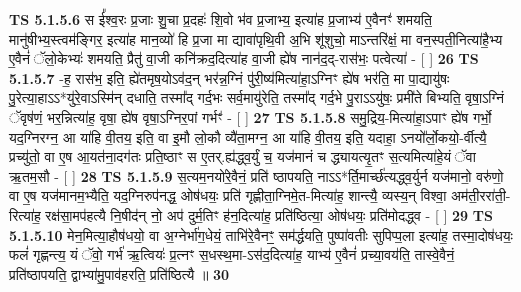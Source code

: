 \documentclass[17pt]{extarticle}
\begin{document}
                  \newline
                                \textbf{ TS 5.1.5.6} \newline
                  स ई᳚श्व॒रः प्र॒जाः शु॒चा प्र॒दहः॑ शि॒वो भ॑व प्र॒जाभ्य॒ इत्या॑ह प्र॒जाभ्य॑ ए॒वैनꣳ॑ शमयति॒ मानु॑षीभ्य॒स्त्वम॑ङ्गिर॒ इत्या॑ह मान॒व्यो॑ हि प्र॒जा मा द्यावा॑पृथि॒वी अ॒भि शू॑शुचो॒ माऽन्तरि॑क्षं॒ मा वन॒स्पती॒नित्या॑है॒भ्य ए॒वैनं॑ ॅलो॒केभ्यः॑ शमयति॒ प्रैतु॑ वा॒जी कनि॑क्रद॒दित्या॑ह वा॒जी ह्ये॑ष नान॑द॒द्-रास॑भः॒ पत्वेत्या॑ - [  ] \textbf{  26} \newline
                  \newline
                                \textbf{ TS 5.1.5.7} \newline
                  -ह॒ रास॑भ॒ इति॒ ह्ये॑तमृष॒योऽव॑द॒न् भर॑न्न॒ग्निं पु॑री॒ष्य॑मित्या॑हा॒ऽग्निꣳ ह्ये॑ष भर॑ति॒ मा पा॒द्यायु॑षः पु॒रेत्या॒हाऽऽ*यु॑रे॒वाऽस्मि॑न् दधाति॒ तस्मा᳚द् गर्द॒भः सर्व॒मायु॑रेति॒ तस्मा᳚द् गर्द॒भे पु॒राऽऽयु॑षः॒ प्रमी॑ते बिभ्यति॒ वृषा॒ऽग्निं ॅवृष॑णं॒ भर॒न्नित्या॑ह॒ वृषा॒ ह्ये॑ष वृषा॒ऽग्निर॒पां गर्भꣳ॑ - [  ] \textbf{  27} \newline
                  \newline
                                \textbf{ TS 5.1.5.8} \newline
                  समु॒द्रिय॒-मित्या॑हा॒ऽपाꣳ ह्ये॑ष गर्भो॒ यद॒ग्निरग्न॒ आ या॑हि वी॒तय॒ इति॒ वा इ॒मौ लो॒कौ व्यै॑ता॒मग्न॒ आ या॑हि वी॒तय॒ इति॒ यदाहा॒ ऽनयो᳚र्लो॒कयो॒-र्वीत्यै॒ प्रच्यु॑तो॒ वा ए॒ष आ॒यत॑ना॒दग॑तः प्रति॒ष्ठाꣳ स ए॒तर्.ह्य॑द्ध्व॒र्युं च॒ यज॑मानं च द्ध्यायत्यृ॒तꣳ स॒त्यमित्या॑हे॒यं ॅवा ऋ॒तम॒सौ - [  ] \textbf{  28} \newline
                  \newline
                                \textbf{ TS 5.1.5.9} \newline
                  स॒त्यम॒नयो॑रे॒वैनं॒ प्रति॑ ष्ठापयति॒ नाऽऽ*र्ति॒मार्च्छ॑त्यद्ध्व॒र्युर्न यज॑मानो॒ वरु॑णो॒ वा ए॒ष यज॑मानम॒भ्यैति॒ यद॒ग्निरुप॑नद्ध॒ ओष॑धयः॒ प्रति॑ गृह्णीता॒ग्निमे॒त-मित्या॑ह॒ शान्त्यै॒ व्यस्य॒न् विश्वा॒ अम॑ती॒ररा॑ती॒-रित्या॑ह॒ रक्ष॑सा॒मप॑हत्यै नि॒षीद॑न् नो॒ अप॑ दुर्म॒तिꣳ ह॑न॒दित्या॑ह॒ प्रति॑ष्ठित्या॒ ओष॑धयः॒ प्रति॑मोदद्ध्व - [  ] \textbf{  29} \newline
                  \newline
                                \textbf{ TS 5.1.5.10} \newline
                  मेन॒मित्या॒हौष॑धयो॒ वा अ॒ग्नेर्भा॑ग॒धेयं॒ ताभि॑रे॒वैनꣳ॒॒ सम॑र्द्धयति॒ पुष्पा॑वतीः सुपिप्प॒ला इत्या॑ह॒ तस्मा॒दोष॑धयः॒ फलं॑ गृह्णन्त्य॒ यं ॅवो॒ गर्भ॑ ऋ॒त्वियः॑ प्र॒त्नꣳ स॒धस्थ॒मा-ऽस॑द॒दित्या॑ह॒ याभ्य॑ ए॒वैनं॑ प्रच्या॒वय॑ति॒ तास्वे॒वैनं॒ प्रति॑ष्ठापयति॒ द्वाभ्या॑मु॒पाव॑हरति॒ प्रति॑ष्ठित्यै ॥ \textbf{  30} \newline
\end{document}
